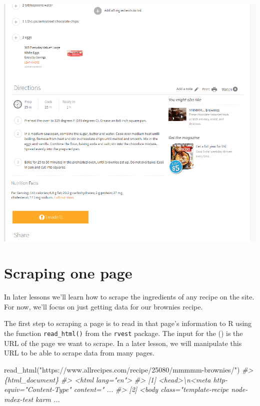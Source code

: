 \documentclass[
  12pt,
  openany]{book}
\newenvironment{Shaded}{\begin{snugshade}}{\end{snugshade}}
\newcommand{\CommentTok}[1]{\textcolor[rgb]{0.37,0.37,0.37}{\textit{#1}}}
\newcommand{\FunctionTok}[1]{\textcolor[rgb]{0,0,0}{#1}}
\newcommand{\NormalTok}[1]{#1}
\newcommand{\StringTok}[1]{\textcolor[rgb]{0.5,0.5,0.5}{#1}}
\begin{document}
\includegraphics{images/brownies_2.PNG}

\hypertarget{scraping-one-page}{%
\section{Scraping one page}\label{scraping-one-page}}

In later lessons we'll learn how to scrape the ingredients of any recipe on the site. For now, we'll focus on just getting data for our brownies recipe.

The first step to scraping a page is to read in that page's information to R using the function \texttt{read\_html()} from the \texttt{rvest} package. The input for the () is the URL of the page we want to scrape. In a later lesson, we will manipulate this URL to be able to scrape data from many pages.

\begin{Shaded}
\begin{Highlighting}[]
\FunctionTok{read\_html}\NormalTok{(}\StringTok{"https://www.allrecipes.com/recipe/25080/mmmmm{-}brownies/"}\NormalTok{)}
\CommentTok{\#\textgreater{} \{html\_document\}}
\CommentTok{\#\textgreater{} \textless{}html lang="en"\textgreater{}}
\CommentTok{\#\textgreater{} [1] \textless{}head\textgreater{}\textbackslash{}n\textless{}meta http{-}equiv="Content{-}Type" content=" ...}
\CommentTok{\#\textgreater{} [2] \textless{}body class="template{-}recipe node{-} mdex{-}test karm ...}
\end{Highlighting}
\end{Shaded}
\end{document}
